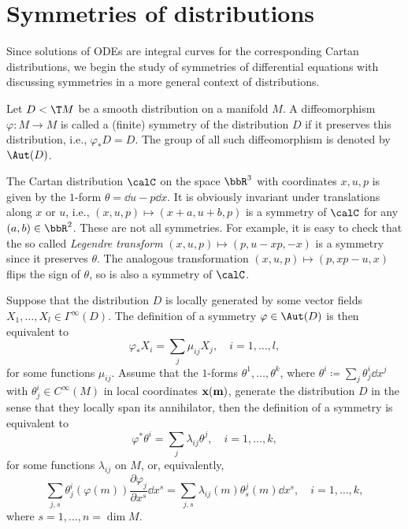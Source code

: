 \section{Symmetries of distributions}


Since solutions of ODEs are integral curves for the corresponding Cartan distributions, we begin the study of symmetries of differential equations with discussing symmetries in a more general context of distributions.

\begin{defn}
    Let $D<\T M$ be a smooth distribution on a manifold $M$. A diffeomorphism $\varphi:M\to M$ is called a (finite) symmetry of the distribution $D$ if it preserves this distribution, i.e., $\varphi_\ast D=D$. The group of all such diffeomorphism is denoted by $\Aut(D)$.
\end{defn}

\begin{example}
    The Cartan distribution $\calC$ on the space $\bbR^3$ with coordinates $x,u,p$ is given by the $1$-form $\theta=\dd u-p\dd x$. It is obviously invariant under translations along $x$ or $u$, i.e., $(x,u,p)\mapsto (x+a,u+b,p)$ is a symmetry of $\calC$ for any $(a,b)\in\bbR^2$. These are not all symmetries. For example, it is easy to check that the so called \emph{Legendre transform} $(x,u,p)\mapsto (p,u-xp,-x)$  is a symmetry since it preserves $\theta$. The analogous transformation $(x,u,p)\mapsto (p,xp-u,x)$ flips the sign of $\theta$, so is also a symmetry of $\calC$.
\end{example}

Suppose that the distribution $D$ is locally generated by some vector fields $X_1,\ldots,X_l\in\Gamma^\infty(D)$. The definition of a symmetry $\varphi\in\Aut(D)$ is then equivalent to 
\[\varphi_\ast X_i=\sum_{j}\mu_{ij}X_j,\quad i=1,\ldots,l,\]
for some functions $\mu_{ij}$. Assume that the $1$-forms $\theta^1,\ldots,\theta^k$, where $\theta^i\coloneqq \sum_j\theta^{i}_j\dd x^j$ with $\theta^i_{j}\in C^\infty(M)$ in local coordinates $\bf{x}(m)$, generate the distribution $D$ in the sense that they locally span its annihilator, then the definition of a symmetry is equivalent to 
\[\varphi^\ast \theta^i=\sum_j\lambda_{ij}\theta^j,\quad i=1,\ldots,k,\]
for some functions $\lambda_{ij}$ on $M$, or, equivalently, 
\[\sum_{j,s}\theta^{i}_j(\varphi(m))\frac{\partial\varphi_j}{\partial x^s}\dd x^s=\sum_{j,s}\lambda_{ij}(m)\theta^{j}_s(m)\dd x^s,\quad i=1,\ldots,k,\]
where $s=1,\ldots,n=\dim M$. 

